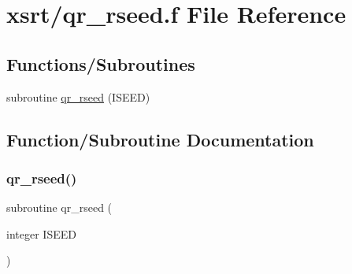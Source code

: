 \hypertarget{qr__rseed_8f}{}\section{xsrt/qr\+\_\+rseed.f File Reference}
\label{qr__rseed_8f}
\subsection*{Functions/\+Subroutines}
\begin{DoxyCompactItemize}
\item 
subroutine \hyperlink{qr__rseed_8f_a60481dadb5eacebd6a7b8e8b9259f654}{qr\+\_\+rseed} (I\+S\+E\+ED)
\end{DoxyCompactItemize}


\subsection{Function/\+Subroutine Documentation}
\mbox{\label{qr__rseed_8f_a60481dadb5eacebd6a7b8e8b9259f654}} 
\subsubsection{\texorpdfstring{qr\+\_\+rseed()}{qr\_rseed()}}
{\footnotesize\ttfamily subroutine qr\+\_\+rseed (\begin{DoxyParamCaption}\item[{integer}]{I\+S\+E\+ED }\end{DoxyParamCaption})}

